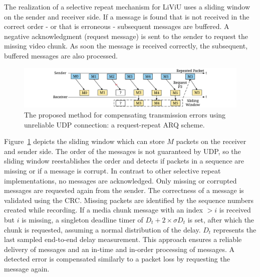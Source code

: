 The realization of a selective repeat mechanism for \ac{LiViU} uses a sliding window on the sender and receiver side. 
If a message is found that is not received in the correct order - or that is erroneous - subsequent messages are buffered. 
A negative acknowledgment (request message) is sent to the sender to request the missing video chunk. 
As soon the message is received correctly, the subsequent, buffered messages are also processed. 
\begin{figure}
	\centering
	\includegraphics[width=\linewidth]{./gfx/500_MobileUpload/Sliding_Window_Selective_repeat}
	\caption[Request-repeat ARQ scheme]{The proposed method for compensating transmission errors using unreliable UDP connection: a request-repeat ARQ scheme.}
	\label{fig:522_slidingwindowselectiverepeat}
\end{figure}

Figure~\ref{fig:522_slidingwindowselectiverepeat} depicts the sliding window which can store $M$ packets on the receiver and sender side.
The order of the messages is not guaranteed by \ac{UDP}, so the sliding window reestablishes the order and detects if packets in a sequence are missing or if a message is corrupt.
In contrast to other selective repeat implementations, no messages are acknowledged.
Only missing or corrupted messages are requested again from the sender.
The correctness of a message is validated using the \ac{CRC}.
Missing packets are identified by the sequence numbers created while recording.
If a media chunk message with an index $> i$ is received but $i$ is missing, a singleton deadline timer of $D_t+2\times \sigma D_t$ is set, after which the chunk is requested, assuming a normal distribution of the delay.
$D_t$ represents the last sampled end-to-end delay measurement.
This approach ensures a reliable delivery of messages and an in-time and in-order processing of messages.
A detected error is compensated similarly to a packet loss by requesting the message again.
